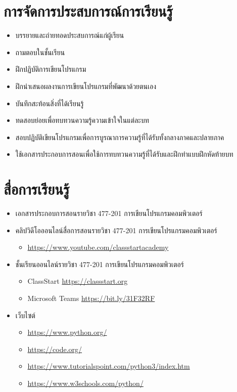 \section*{การจัดการประสบการณ์การเรียนรู้}

\begin{itemize}
\item บรรยายและถ่ายทอดประสบการณ์แก่ผู้เรียน
\item ถามตอบในชั้นเรียน
\item ฝึกปฏิบัติการเขียนโปรแกรม
\item  ฝึกนำเสนอผลงานการเขียนโปรแกรมที่พัฒนาด้วยตนเอง
\item  บันทึกสะท้อนสิ่งที่ได้เรียนรู้
\item  ทดสอบย่อยเพื่อทบทวนความรู้ความเข้าใจในแต่ละบท
\item  สอบปฏิบัติเขียนโปรแกรมเพื่อการบูรณาการความรู้ที่ได้รับทั้งกลางภาคและปลายภาค
\item  ใช้เอกสารประกอบการสอนเพื่อใช้การทบทวนความรู้ที่ได้รับและฝึกทำแบบฝึกหัดท้ายบท
\end{itemize}


\section*{สื่อการเรียนรู้}

\begin{itemize}
\item เอกสารประกอบการสอนรายวิชา 477-201 การเขียนโปรแกรมคอมพิวเตอร์
\item คลิปวิดีโอออนไลน์สื่อการสอนรายวิชา 477-201 การเขียนโปรแกรมคอมพิวเตอร์
    \begin{itemize}
    \item \url{https://www.youtube.com/classstartacademy}
    \end{itemize}
\item ชั้นเรียนออนไลน์รายวิชา 477-201 การเขียนโปรแกรมคอมพิวเตอร์
    \begin{itemize}
    \item ClassStart \url{https://classstart.org}
    \item Microsoft Teams \url{ https://bit.ly/31F32RF}
    \end{itemize}
\item เว็บไซต์
    \begin{itemize}
    \item \url{https://www.python.org/}
    \item \url{https://code.org/}
    \item \url{https://www.tutorialspoint.com/python3/index.htm}
    \item \url{https://www.w3schools.com/python/}
    \end{itemize}
\end{itemize}

